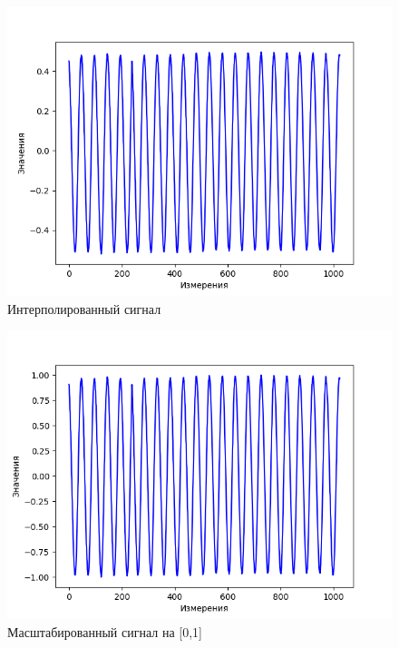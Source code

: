 \documentclass[12pt,a4paper]{article}
\begin{document}
\begin{figure}[H]
    \centering
    \includegraphics[scale=0.8]{images/interpolation.png}
    \caption{Интерполированный сигнал}
\end{figure}

\begin{figure}[H]
    \centering
    \includegraphics[scale=0.8]{images/one_scale.png}
    \caption{Масштабированный сигнал на [0,1]}
\end{figure}
\end{document}

